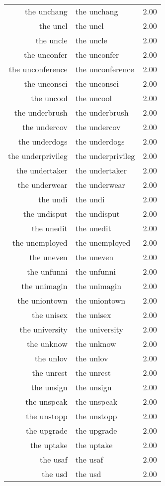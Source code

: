 \begin{table}[ht]
\begin{tabular}{rlr}
  the unchang & the unchang & 2.00 \\ 
  the uncl & the uncl & 2.00 \\ 
  the uncle & the uncle & 2.00 \\ 
  the unconfer & the unconfer & 2.00 \\ 
  the unconference & the unconference & 2.00 \\ 
  the unconsci & the unconsci & 2.00 \\ 
  the uncool & the uncool & 2.00 \\ 
  the underbrush & the underbrush & 2.00 \\ 
  the undercov & the undercov & 2.00 \\ 
  the underdogs & the underdogs & 2.00 \\ 
  the underprivileg & the underprivileg & 2.00 \\ 
  the undertaker & the undertaker & 2.00 \\ 
  the underwear & the underwear & 2.00 \\ 
  the undi & the undi & 2.00 \\ 
  the undisput & the undisput & 2.00 \\ 
  the unedit & the unedit & 2.00 \\ 
  the unemployed & the unemployed & 2.00 \\ 
  the uneven & the uneven & 2.00 \\ 
  the unfunni & the unfunni & 2.00 \\ 
  the unimagin & the unimagin & 2.00 \\ 
  the uniontown & the uniontown & 2.00 \\ 
  the unisex & the unisex & 2.00 \\ 
  the university & the university & 2.00 \\ 
  the unknow & the unknow & 2.00 \\ 
  the unlov & the unlov & 2.00 \\ 
  the unrest & the unrest & 2.00 \\ 
  the unsign & the unsign & 2.00 \\ 
  the unspeak & the unspeak & 2.00 \\ 
  the unstopp & the unstopp & 2.00 \\ 
  the upgrade & the upgrade & 2.00 \\ 
  the uptake & the uptake & 2.00 \\ 
  the usaf & the usaf & 2.00 \\ 
  the usd & the usd & 2.00 \\ 

\end{tabular}
\end{table}
